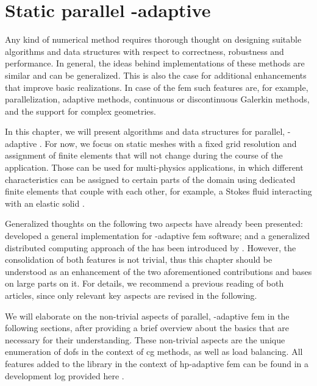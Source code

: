 \chapter{Static parallel \hp-adaptive }
\label{ch:parallel}
\glsresetall

Any kind of numerical method requires thorough thought on designing suitable algorithms and data structures with respect to correctness, robustness and performance. In general, the ideas behind implementations of these methods are similar and can be generalized.
This is also the case for additional enhancements that improve basic realizations. In case of the \gls{fem} such features are, for example, parallelization, adaptive methods, continuous or discontinuous Galerkin methods, and the support for complex geometries.

In this chapter, we will present algorithms and data structures for parallel, \hp-adaptive . For now, we focus on static meshes with a fixed grid resolution and assignment of finite elements that will not change during the course of the application. Those can be used for multi-physics applications, in which different characteristics can be assigned to certain parts of the domain using dedicated finite elements that couple with each other, for example, a Stokes fluid interacting with an elastic solid \textcite{dealiistep-46}.

Generalized thoughts on the following two aspects have already been presented: \textcite{bangerth2009} developed a general implementation for \hp-adaptive \gls{fem} software; and a generalized distributed computing approach of the  has been introduced by \textcite{bangerth2012}. However, the consolidation of both features is not trivial, thus this chapter should be understood as an enhancement of the two aforementioned contributions and bases on large parts on it. For details, we recommend a previous reading of both articles, since only relevant key aspects are revised in the following.

We will elaborate on the non-trivial aspects of parallel, \hp-adaptive \gls{fem} in the following sections, after providing a brief overview about the basics that are necessary for their understanding. These non-trivial aspects are the unique enumeration of \glspl{dof} in the context of \gls{cg} methods, as well as load balancing. All features added to the \dealii{} library in the context of hp-adaptive \gls{fem} can be found in a development log provided here \textcite{dealiiissue3511}.





